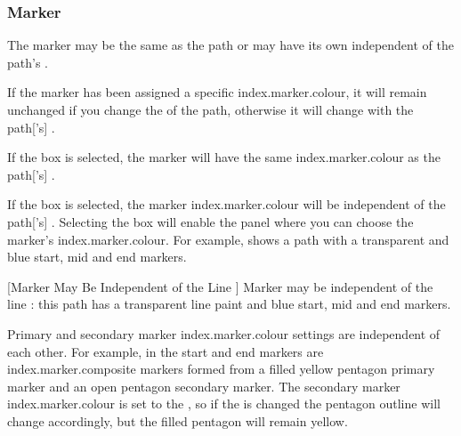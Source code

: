 \subsubsection{Marker }\label{sec:markerpaint}

The marker  may be the same as the
path or may have its own 
independent of the path's .

\begin{information}
If the marker has been assigned a specific \gls{index.marker.colour}, it
will remain unchanged if you change the  of the
\gls*{path}, otherwise it will change with the \gls*{path}['s]
.
\end{information}


If the  box is selected, the marker will
have the same \gls{index.marker.colour} as the \gls*{path}['s]
.


If the  box is selected, the marker
\gls{index.marker.colour} will be independent of the \gls*{path}['s]
. Selecting the  box 
will enable the  panel where you can choose
the marker's \gls{index.marker.colour}.
For example,  shows a \gls*{path} with
a \gls{transparent}  and blue start, mid and end
markers.

{}
[Marker  May Be Independent of the Line ]
{Marker  may be independent of the line
:
this path has a transparent line paint and blue
start, mid and end markers.}

Primary and secondary marker \gls{index.marker.colour} settings are
independent of each other.  For example, in
 the start and end markers are
\gls{index.marker.composite} markers formed from a filled yellow
pentagon primary marker and an open pentagon secondary marker. The
secondary marker \gls{index.marker.colour} is set to the
, so if the  is changed
the pentagon outline will change accordingly, but the filled
pentagon will remain yellow.

